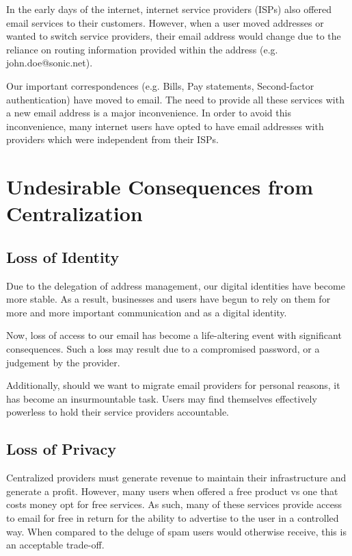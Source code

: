 \documentclass{article}
\theoremstyle{definition}
\begin{document}
In the early days of the internet, internet service providers (ISPs) also offered email services to their customers. However, when a user moved addresses or wanted to switch service providers, their email address would change due to the reliance on routing information provided within the address (e.g. john.doe@sonic.net). 

Our important correspondences (e.g. Bills, Pay statements, Second-factor authentication) have moved to email. The need to provide all these services with a new email address is a major inconvenience. In order to avoid this inconvenience, many internet users have opted to have email addresses with providers which were independent from their ISPs.

\section{Undesirable Consequences from Centralization} 

\subsection{Loss of Identity}

Due to the delegation of address management, our digital identities have become more stable. As a result, businesses and users have begun to rely on them for more and more important communication and as a digital identity.

Now, loss of access to our email has become a life-altering event with significant consequences. Such a loss may result due to a compromised password, or a judgement by the provider. 

Additionally, should we want to migrate email providers for personal reasons, it has become an insurmountable task. Users may find themselves effectively powerless to hold their service providers accountable.

\subsection{Loss of Privacy}

Centralized providers must generate revenue to maintain their infrastructure and generate a profit. However, many users when offered a free product vs one that costs money opt for free services. As such, many of these services provide access to email for free in return for the ability to advertise to the user in a controlled way. When compared to the deluge of spam users would otherwise receive, this is an acceptable trade-off.
\end{document}
